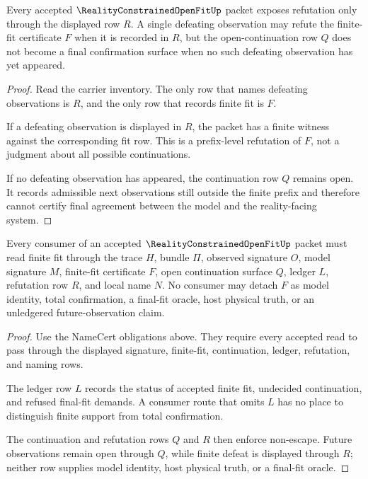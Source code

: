 \begin{theorem}
\label{thm:reality-constrained-open-fit-finite-refutation-surface}
Every accepted $\RealityConstrainedOpenFitUp$ packet exposes refutation only through the displayed row $R$. A single defeating observation may refute the finite-fit certificate $F$ when it is recorded in $R$, but the open-continuation row $Q$ does not become a final confirmation surface when no such defeating observation has yet appeared.
\end{theorem}
\begin{proof}
Read the carrier inventory. The only row that names defeating observations is $R$, and the only row that records finite fit is $F$.

If a defeating observation is displayed in $R$, the packet has a finite witness against the corresponding fit row. This is a prefix-level refutation of $F$, not a judgment about all possible continuations.

If no defeating observation has appeared, the continuation row $Q$ remains open. It records admissible next observations still outside the finite prefix and therefore cannot certify final agreement between the model and the reality-facing system.
\end{proof}

\begin{theorem}
\label{thm:reality-constrained-open-fit-ledger-nonescape}
Every consumer of an accepted $\RealityConstrainedOpenFitUp$ packet must read finite fit through the trace $H$, bundle $\Pi$, observed signature $O$, model signature $M$, finite-fit certificate $F$, open continuation surface $Q$, ledger $L$, refutation row $R$, and local name $N$. No consumer may detach $F$ as model identity, total confirmation, a final-fit oracle, host physical truth, or an unledgered future-observation claim.
\end{theorem}
\begin{proof}
Use the NameCert obligations above. They require every accepted read to pass through the displayed signature, finite-fit, continuation, ledger, refutation, and naming rows.

The ledger row $L$ records the status of accepted finite fit, undecided continuation, and refused final-fit demands. A consumer route that omits $L$ has no place to distinguish finite support from total confirmation.

The continuation and refutation rows $Q$ and $R$ then enforce non-escape. Future observations remain open through $Q$, while finite defeat is displayed through $R$; neither row supplies model identity, host physical truth, or a final-fit oracle.
\end{proof}

